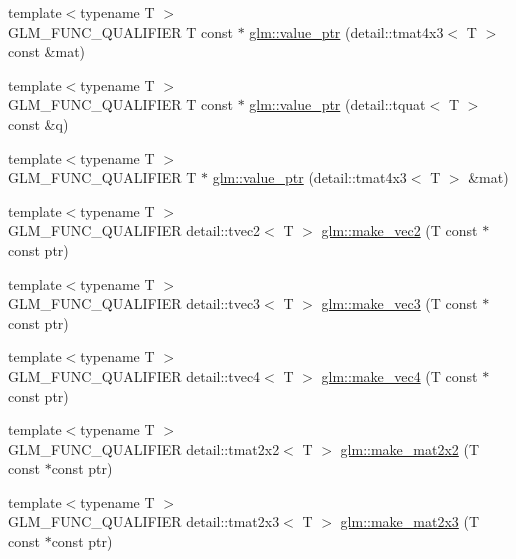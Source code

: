 \begin{DoxyCompactItemize}
\item 
{\footnotesize template$<$typename T $>$ }\\G\+L\+M\+\_\+\+F\+U\+N\+C\+\_\+\+Q\+U\+A\+L\+I\+F\+I\+E\+R T const $\ast$ \hyperlink{group__gtc__type__ptr_gacca7d201301551a24dbf7eef343a14c1}{glm\+::value\+\_\+ptr} (detail\+::tmat4x3$<$ T $>$ const \&mat)
\item 
{\footnotesize template$<$typename T $>$ }\\G\+L\+M\+\_\+\+F\+U\+N\+C\+\_\+\+Q\+U\+A\+L\+I\+F\+I\+E\+R T const $\ast$ \hyperlink{group__gtc__type__ptr_ga348519eaf9bb56244727eabb314f6892}{glm\+::value\+\_\+ptr} (detail\+::tquat$<$ T $>$ const \&q)
\item 
{\footnotesize template$<$typename T $>$ }\\G\+L\+M\+\_\+\+F\+U\+N\+C\+\_\+\+Q\+U\+A\+L\+I\+F\+I\+E\+R T $\ast$ \hyperlink{group__gtc__type__ptr_gae821d2d76715dfe8eb4a9c7eac845dc4}{glm\+::value\+\_\+ptr} (detail\+::tmat4x3$<$ T $>$ \&mat)
\item 
{\footnotesize template$<$typename T $>$ }\\G\+L\+M\+\_\+\+F\+U\+N\+C\+\_\+\+Q\+U\+A\+L\+I\+F\+I\+E\+R detail\+::tvec2$<$ T $>$ \hyperlink{group__gtc__type__ptr_ga60e64ef452541f76f7b5b4e04b18062a}{glm\+::make\+\_\+vec2} (T const $\ast$const ptr)
\item 
{\footnotesize template$<$typename T $>$ }\\G\+L\+M\+\_\+\+F\+U\+N\+C\+\_\+\+Q\+U\+A\+L\+I\+F\+I\+E\+R detail\+::tvec3$<$ T $>$ \hyperlink{group__gtc__type__ptr_ga0e2e7d24d80edb5a95a86c6a76ae5a41}{glm\+::make\+\_\+vec3} (T const $\ast$const ptr)
\item 
{\footnotesize template$<$typename T $>$ }\\G\+L\+M\+\_\+\+F\+U\+N\+C\+\_\+\+Q\+U\+A\+L\+I\+F\+I\+E\+R detail\+::tvec4$<$ T $>$ \hyperlink{group__gtc__type__ptr_ga5d91c17941c35effc46b335ad6fb6252}{glm\+::make\+\_\+vec4} (T const $\ast$const ptr)
\item 
{\footnotesize template$<$typename T $>$ }\\G\+L\+M\+\_\+\+F\+U\+N\+C\+\_\+\+Q\+U\+A\+L\+I\+F\+I\+E\+R detail\+::tmat2x2$<$ T $>$ \hyperlink{group__gtc__type__ptr_ga1d0007368a23e89e4a0efcda06c1fa27}{glm\+::make\+\_\+mat2x2} (T const $\ast$const ptr)
\item 
{\footnotesize template$<$typename T $>$ }\\G\+L\+M\+\_\+\+F\+U\+N\+C\+\_\+\+Q\+U\+A\+L\+I\+F\+I\+E\+R detail\+::tmat2x3$<$ T $>$ \hyperlink{group__gtc__type__ptr_ga87d29f47fbd3990a344be2eac404aee3}{glm\+::make\+\_\+mat2x3} (T const $\ast$const ptr)

\end{DoxyCompactItemize}

